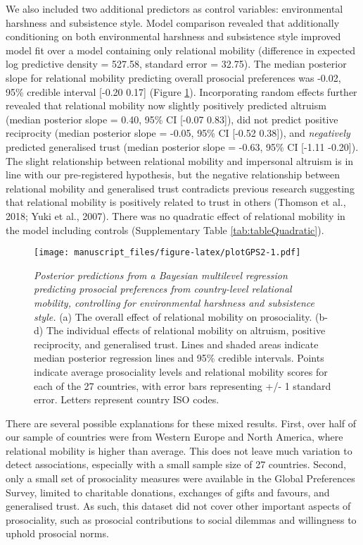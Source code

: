 \documentclass[
  man,floatsintext]{apa6}
\begin{document}
We also included two additional predictors as control variables: environmental harshness and subsistence style. Model comparison revealed that additionally conditioning on both environmental harshness and subsistence style improved model fit over a model containing only relational mobility (difference in expected log predictive density = 527.58, standard error = 32.75). The median posterior slope for relational mobility predicting overall prosocial preferences was -0.02, 95\% credible interval {[}-0.20 0.17{]} (Figure \ref{fig:plotGPS2}). Incorporating random effects further revealed that relational mobility now slightly positively predicted altruism (median posterior slope = 0.40, 95\% CI {[}-0.07 0.83{]}), did not predict positive reciprocity (median posterior slope = -0.05, 95\% CI {[}-0.52 0.38{]}), and \emph{negatively} predicted generalised trust (median posterior slope = -0.63, 95\% CI {[}-1.11 -0.20{]}). The slight relationship between relational mobility and impersonal altruism is in line with our pre-registered hypothesis, but the negative relationship between relational mobility and generalised trust contradicts previous research suggesting that relational mobility is positively related to trust in others (Thomson et al., 2018; Yuki et al., 2007). There was no quadratic effect of relational mobility in the model including controls (Supplementary Table \ref{tab:tableQuadratic}).



\begin{figure}
\centering
\texttt{[image: manuscript\_files/figure-latex/plotGPS2-1.pdf]}
\caption{\label{fig:plotGPS2}\emph{Posterior predictions from a Bayesian multilevel regression predicting prosocial preferences from country-level relational mobility, controlling for environmental harshness and subsistence style.} (a) The overall effect of relational mobility on prosociality. (b-d) The individual effects of relational mobility on altruism, positive reciprocity, and generalised trust. Lines and shaded areas indicate median posterior regression lines and 95\% credible intervals. Points indicate average prosociality levels and relational mobility scores for each of the 27 countries, with error bars representing +/- 1 standard error. Letters represent country ISO codes.}
\end{figure}

There are several possible explanations for these mixed results. First, over half of our sample of countries were from Western Europe and North America, where relational mobility is higher than average. This does not leave much variation to detect associations, especially with a small sample size of 27 countries. Second, only a small set of prosociality measures were available in the Global Preferences Survey, limited to charitable donations, exchanges of gifts and favours, and generalised trust. As such, this dataset did not cover other important aspects of prosociality, such as prosocial contributions to social dilemmas and willingness to uphold prosocial norms.
\end{document}
